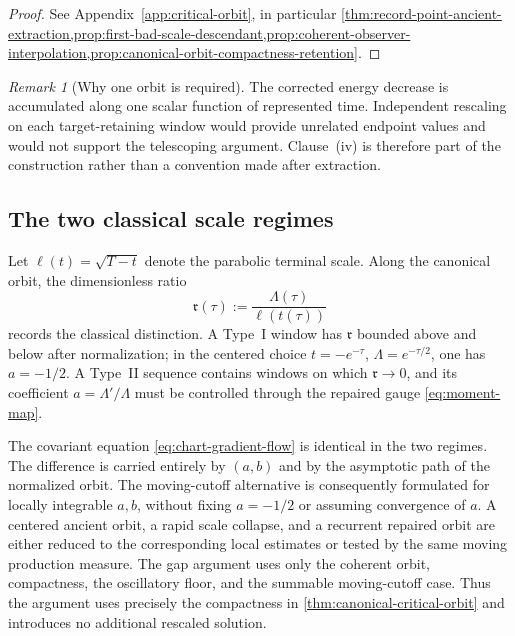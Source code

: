 \documentclass[11pt]{amsart}
\numberwithin{equation}{section}
\theoremstyle{plain}
\theoremstyle{definition}
\theoremstyle{remark}
\newtheorem{remark}[remark]{Remark}
\begin{document}
\begin{proof}
See Appendix~\ref{app:critical-orbit}, in particular
\cref{thm:record-point-ancient-extraction,prop:first-bad-scale-descendant,prop:coherent-observer-interpolation,prop:canonical-orbit-compactness-retention}.
\end{proof}

\begin{remark}[Why one orbit is required]
The corrected energy decrease is accumulated along one scalar function of represented time.
Independent rescaling on each target-retaining window would provide unrelated endpoint
values and would not support the telescoping argument.  Clause~\textup{(iv)}
is therefore part of the construction rather than a convention made after
extraction.
\end{remark}

\subsection{The two classical scale regimes}

Let \(\ell(t)=\sqrt{T-t}\) denote the parabolic terminal scale.  Along the
canonical orbit, the dimensionless ratio
\begin{equation}\label{eq:scale-ratio}
 \mathfrak r(\tau):=\frac{\Lambda(\tau)}{\ell(t(\tau))}
\end{equation}
records the classical distinction.  A Type~I window has
\(\mathfrak r\) bounded above and below after normalization; in the centered
choice \(t=-e^{-\tau}\), \(\Lambda=e^{-\tau/2}\), one has
\(a=-1/2\).  A Type~II sequence contains windows on which
\(\mathfrak r\to0\), and its coefficient \(a=\Lambda'/\Lambda\) must be
controlled through the repaired gauge \eqref{eq:moment-map}.

The covariant equation \eqref{eq:chart-gradient-flow} is identical in the two
regimes.  The difference is carried entirely by \((a,b)\) and by the
asymptotic path of the normalized orbit.  The moving-cutoff alternative is
consequently formulated for locally integrable \(a,b\), without fixing
\(a=-1/2\) or assuming convergence of \(a\).  A centered ancient orbit, a
rapid scale collapse, and a recurrent repaired orbit are either reduced to
the corresponding local estimates or tested by the same moving production measure.
The gap argument uses only the coherent orbit, compactness, the oscillatory
floor, and the summable moving-cutoff case.
Thus the argument uses precisely the compactness in
\cref{thm:canonical-critical-orbit} and introduces no additional rescaled
solution.
\end{document}
